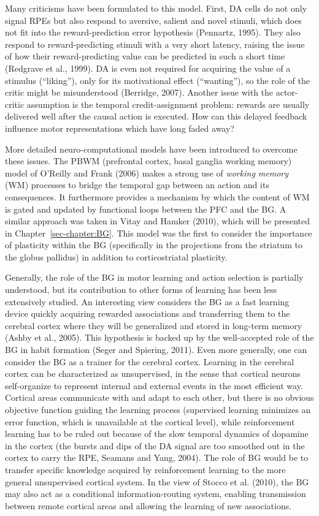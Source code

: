 \documentclass[
  11pt,
  a4paper,
]{scrbook}
\begin{document}
Many criticisms have been formulated to this model. First, DA cells do
not only signal RPEs but also respond to aversive, salient and novel
stimuli, which does not fit into the reward-prediction error hypothesis
(Pennartz, 1995). They also respond to reward-predicting stimuli with a
very short latency, raising the issue of how their reward-predicting
value can be predicted in such a short time (Redgrave et al., 1999). DA
is even not required for acquiring the value of a stimulus (``liking''),
only for its motivational effect (``wanting''), so the role of the
critic might be misunderstood (Berridge, 2007). Another issue with the
actor-critic assumption is the temporal credit-assignment problem:
rewards are usually delivered well after the causal action is executed.
How can this delayed feedback influence motor representations which have
long faded away?

More detailed neuro-computational models have been introduced to
overcome these issues. The PBWM (prefrontal cortex, basal ganglia
working memory) model of O'Reilly and Frank (2006) makes a strong use of
\emph{working memory} (WM) processes to bridge the temporal gap between
an action and its consequences. It furthermore provides a mechanism by
which the content of WM is gated and updated by functional loops between
the PFC and the BG. A similar approach was taken in Vitay and Hamker
(2010), which will be presented in Chapter~\ref{sec-chapter:BG}. This
model was the first to consider the importance of plasticity within the
BG (specifically in the projections from the striatum to the globus
pallidus) in addition to corticostriatal plasticity.

Generally, the role of the BG in motor learning and action selection is
partially understood, but its contribution to other forms of learning
has been less extensively studied. An interesting view considers the BG
as a fast learning device quickly acquiring rewarded associations and
transferring them to the cerebral cortex where they will be generalized
and stored in long-term memory (Ashby et al., 2005). This hypothesis is
backed up by the well-accepted role of the BG in habit formation (Seger
and Spiering, 2011). Even more generally, one can consider the BG as a
trainer for the cerebral cortex. Learning in the cerebral cortex can be
characterized as unsupervised, in the sense that cortical neurons
self-organize to represent internal and external events in the most
efficient way. Cortical areas communicate with and adapt to each other,
but there is no obvious objective function guiding the learning process
(supervised learning minimizes an error function, which is unavailable
at the cortical level), while reinforcement learning has to be ruled out
because of the slow temporal dynamics of dopamine in the cortex (the
bursts and dips of the DA signal are too smoothed out in the cortex to
carry the RPE, Seamans and Yang, 2004). The role of BG would be to
transfer specific knowledge acquired by reinforcement learning to the
more general unsupervised cortical system. In the view of Stocco et al.
(2010), the BG may also act as a conditional information-routing system,
enabling transmission between remote cortical areas and allowing the
learning of new associations.
\end{document}
